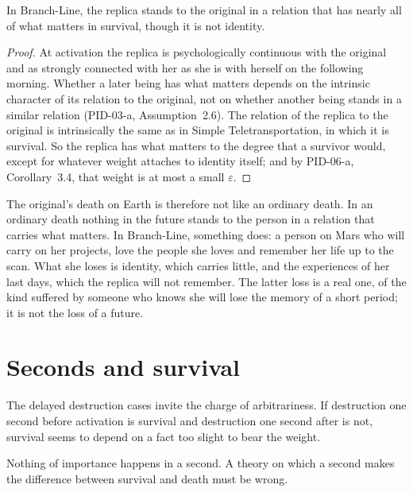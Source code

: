 \documentclass{situationist-preprint}
\begin{document}
\begin{proposition}\label{p:loss}
In Branch-Line, the replica stands to the original in a relation that has nearly all of what matters in survival, though it is not identity.
\end{proposition}

\begin{proof}
At activation the replica is psychologically continuous with the original and as strongly connected with her as she is with herself on the following morning. Whether a later being has what matters depends on the intrinsic character of its relation to the original, not on whether another being stands in a similar relation (PID-03-a, Assumption~2.6). The relation of the replica to the original is intrinsically the same as in Simple Teletransportation, in which it is survival. So the replica has what matters to the degree that a survivor would, except for whatever weight attaches to identity itself; and by PID-06-a, Corollary~3.4, that weight is at most a small $\varepsilon$.
\end{proof}

The original's death on Earth is therefore not like an ordinary death. In an ordinary death nothing in the future stands to the person in a relation that carries what matters. In Branch-Line, something does: a person on Mars who will carry on her projects, love the people she loves and remember her life up to the scan. What she loses is identity, which carries little, and the experiences of her last days, which the replica will not remember. The latter loss is a real one, of the kind suffered by someone who knows she will lose the memory of a short period; it is not the loss of a future.

\section{Seconds and survival}

The delayed destruction cases invite the charge of arbitrariness. If destruction one second before activation is survival and destruction one second after is not, survival seems to depend on a fact too slight to bear the weight.

\begin{objection}
Nothing of importance happens in a second. A theory on which a second makes the difference between survival and death must be wrong.
\end{objection}
\end{document}
